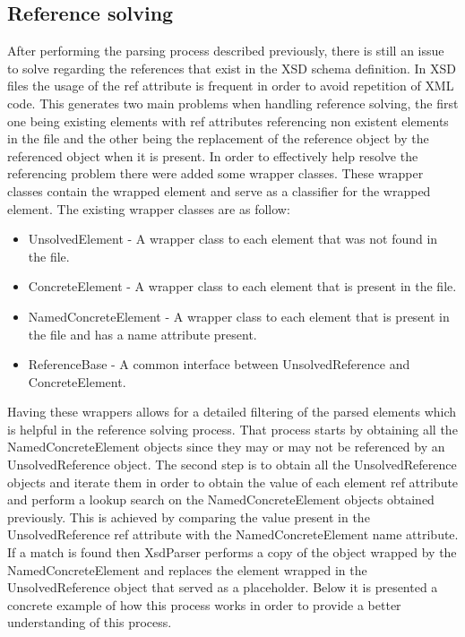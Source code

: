 \subsection{Reference solving}
\label{sec:refsolving}

After performing the parsing process described previously, there is still an issue to solve regarding the references that exist in the \ac{XSD} schema definition. In \ac{XSD} files the usage of the ref attribute is frequent in order to avoid repetition of \ac{XML} code. This generates two main problems when handling reference solving, the first one being existing elements with ref attributes referencing non existent elements in the file and the other being the replacement of the reference object by the referenced object when it is present. In order to effectively help resolve the referencing problem there were added some wrapper classes. These wrapper classes contain the wrapped element and serve as a classifier for the wrapped element. The existing wrapper classes are as follow:

\begin{itemize}  
	\item UnsolvedElement - A wrapper class to each element that was not found in the file.
	\item ConcreteElement - A wrapper class to each element that is present in the file.
	\item NamedConcreteElement - A wrapper class to each element that is present in the file and has a name attribute present.
	\item ReferenceBase - A common interface between UnsolvedReference and ConcreteElement.
\end{itemize}

\noindent
Having these wrappers allows for a detailed filtering of the parsed elements which is helpful in the reference solving process. That process starts by obtaining all the NamedConcreteElement objects since they may or may not be referenced by an UnsolvedReference object. The second step is to obtain all the UnsolvedReference objects and iterate them in order to obtain the value of each element ref attribute and perform a lookup search on the NamedConcreteElement objects obtained previously. This is achieved by comparing the value present in the UnsolvedReference ref attribute with the NamedConcreteElement name attribute. If a match is found then XsdParser performs a copy of the object wrapped by the NamedConcreteElement and replaces the element wrapped in the UnsolvedReference object that served as a placeholder. Below it is presented a concrete example of how this process works in order to provide a better understanding of this process.

